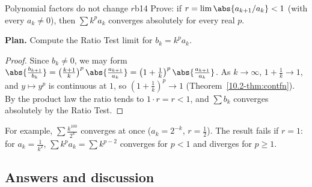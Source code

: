 \documentclass[11pt]{article}
\begin{document}
\begin{exmp}{Polynomial factors do not change $r$}{b14}
Prove: if $r=\lim\abs{a_{k+1}/a_k}<1$ (with every $a_k\ne0$), then $\sum k^pa_k$ converges absolutely for every real $p$.

\textbf{Plan.} Compute the Ratio Test limit for $b_k=k^pa_k$.

\begin{proof}
Since $b_k\ne0$, we may form $\abs{\frac{b_{k+1}}{b_k}}=\left(\frac{k+1}k\right)^p\abs{\frac{a_{k+1}}{a_k}}=\left(1+\frac1k\right)^p\abs{\frac{a_{k+1}}{a_k}}$. As $k\to\infty$, $1+\frac1k\to1$, and $y\mapsto y^p$ is continuous at $1$, so $\left(1+\frac1k\right)^p\to1$ (Theorem~\ref{10.2-thm:contfn}). By the product law the ratio tends to $1\cdot r=r<1$, and $\sum b_k$ converges absolutely by the Ratio Test.
\end{proof}
For example, $\sum\frac{k^{100}}{2^k}$ converges at once ($a_k=2^{-k}$, $r=\frac12$). The result fails if $r=1$: for $a_k=\frac1{k^2}$, $\sum k^pa_k=\sum k^{p-2}$ converges for $p<1$ and diverges for $p\ge1$.
\end{exmp}

\subsection*{Answers and discussion}
\end{document}
